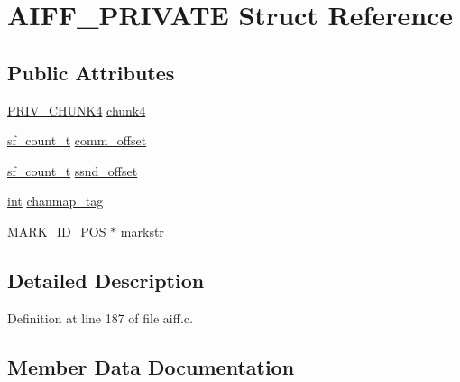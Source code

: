\hypertarget{struct_a_i_f_f___p_r_i_v_a_t_e}{}\section{A\+I\+F\+F\+\_\+\+P\+R\+I\+V\+A\+TE Struct Reference}
\label{struct_a_i_f_f___p_r_i_v_a_t_e}
\subsection*{Public Attributes}
\begin{DoxyCompactItemize}
\item 
\hyperlink{struct_p_r_i_v___c_h_u_n_k4}{P\+R\+I\+V\+\_\+\+C\+H\+U\+N\+K4} \hyperlink{struct_a_i_f_f___p_r_i_v_a_t_e_ac35beb055afa2aa51fe5b4e5d865e479}{chunk4}
\item 
\hyperlink{mac_2config_2i386_2lib-src_2libsndfile_2src_2sndfile_8h_a398121a5f562230ea7f772528fff5f84}{sf\+\_\+count\+\_\+t} \hyperlink{struct_a_i_f_f___p_r_i_v_a_t_e_aedcc8b9ac6de2da262953f0390f81a65}{comm\+\_\+offset}
\item 
\hyperlink{mac_2config_2i386_2lib-src_2libsndfile_2src_2sndfile_8h_a398121a5f562230ea7f772528fff5f84}{sf\+\_\+count\+\_\+t} \hyperlink{struct_a_i_f_f___p_r_i_v_a_t_e_a3431a71b82f61768335ede9d964d5b9b}{ssnd\+\_\+offset}
\item 
\hyperlink{xmltok_8h_a5a0d4a5641ce434f1d23533f2b2e6653}{int} \hyperlink{struct_a_i_f_f___p_r_i_v_a_t_e_a86be46ecc2dc87b3aea0e15588a2f41c}{chanmap\+\_\+tag}
\item 
\hyperlink{struct_m_a_r_k___i_d___p_o_s}{M\+A\+R\+K\+\_\+\+I\+D\+\_\+\+P\+OS} $\ast$ \hyperlink{struct_a_i_f_f___p_r_i_v_a_t_e_aab90a56ed50606c5afad05f7aaf85592}{markstr}
\end{DoxyCompactItemize}


\subsection{Detailed Description}


Definition at line 187 of file aiff.\+c.



\subsection{Member Data Documentation}
